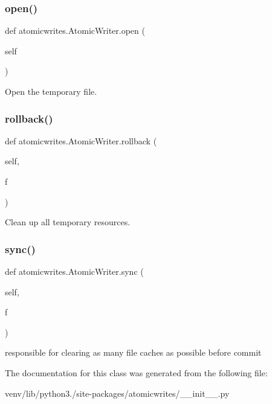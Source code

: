 \subsubsection{\texorpdfstring{open()}{open()}}
{\footnotesize\ttfamily def atomicwrites.\+Atomic\+Writer.\+open (\begin{DoxyParamCaption}\item[{}]{self }\end{DoxyParamCaption})}

\begin{DoxyVerb}Open the temporary file.
\end{DoxyVerb}
 \mbox{\label{classatomicwrites_1_1_atomic_writer_ac8281b30b809292b03c8c403dea8d4c6}} 
\subsubsection{\texorpdfstring{rollback()}{rollback()}}
{\footnotesize\ttfamily def atomicwrites.\+Atomic\+Writer.\+rollback (\begin{DoxyParamCaption}\item[{}]{self,  }\item[{}]{f }\end{DoxyParamCaption})}

\begin{DoxyVerb}Clean up all temporary resources.\end{DoxyVerb}
 \mbox{\label{classatomicwrites_1_1_atomic_writer_aea0847148c50cefc9bde2de35b4b146f}} 
\subsubsection{\texorpdfstring{sync()}{sync()}}
{\footnotesize\ttfamily def atomicwrites.\+Atomic\+Writer.\+sync (\begin{DoxyParamCaption}\item[{}]{self,  }\item[{}]{f }\end{DoxyParamCaption})}

\begin{DoxyVerb}responsible for clearing as many file caches as possible before
commit\end{DoxyVerb}
 

The documentation for this class was generated from the following file\+:\begin{DoxyCompactItemize}
\item 
venv/lib/python3./site-\/packages/atomicwrites/\+\_\+\+\_\+init\+\_\+\+\_\+.\+py\end{DoxyCompactItemize}
